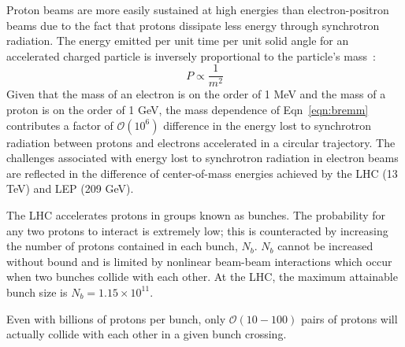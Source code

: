 Proton beams are more easily sustained at high energies than electron-positron beams due to the fact that protons dissipate less energy through synchrotron radiation.
The energy emitted per unit time per unit solid angle for an accelerated charged particle is inversely proportional to the particle's mass~\cite{Jackson:100964}:
\begin{equation}
    P \propto \frac{1}{m^2}
    \label{eqn:bremm}
\end{equation}
Given that the mass of an electron is on the order of 1 MeV and the mass of a proton is on the order of 1 GeV, the mass dependence of Eqn~\ref{eqn:bremm} contributes a factor of $\mathcal O(10^6)$ difference in the energy lost to synchrotron radiation between protons and electrons accelerated in a circular trajectory.
The challenges associated with energy lost to synchrotron radiation in electron beams are reflected in the difference of center-of-mass energies achieved by the LHC (13 TeV) and LEP (209 GeV).

The LHC accelerates protons in groups known as bunches. The probability for any two protons to interact is extremely low; this is counteracted by increasing the number of protons contained in each bunch, $N_b$.
$N_b$ cannot be increased without bound and is limited by nonlinear beam-beam interactions which occur when two bunches collide with each other.
At the LHC, the maximum attainable bunch size is $N_b = 1.15 \times 10^{11}$.

Even with billions of protons per bunch, only $\mathcal O(10-100)$ pairs of protons will actually collide with each other in a given bunch crossing. %

